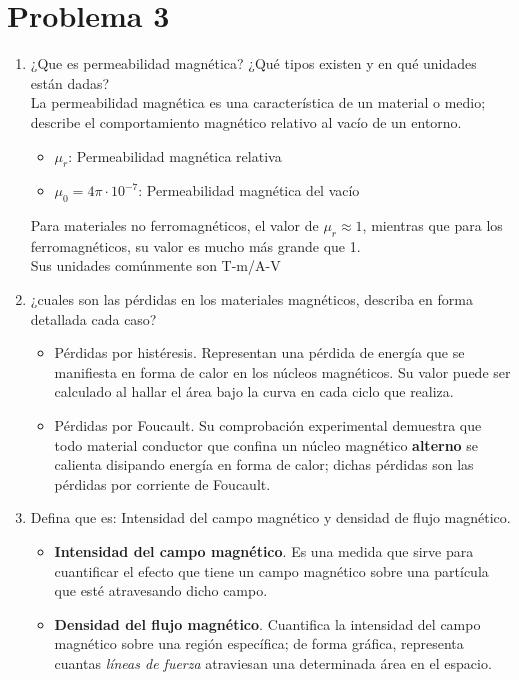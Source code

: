 \documentclass[a4paper,12pt]{article}
\begin{document}
\section*{Problema 3}
\begin{enumerate}
    \item ¿Que es permeabilidad magnética? ¿Qué tipos existen y en qué unidades están
dadas?\\
La permeabilidad magnética es una característica de un material o medio; describe el comportamiento magnético relativo al vacío de un entorno.
\begin{itemize}
    \item $\mu_{r}$: Permeabilidad magnética relativa
    \item $\mu_{0} = 4\pi\cdot 10^{-7}$: Permeabilidad magnética del vacío
\end{itemize}
Para materiales no ferromagnéticos, el valor de $\mu_{r} \approx 1$, mientras que para los ferromagnéticos, su valor es mucho más grande que 1.\\
Sus unidades comúnmente son T-m/A-V
    \item ¿cuales son las pérdidas en los materiales magnéticos, describa en forma detallada
cada caso?
\begin{itemize}
    \item Pérdidas por histéresis. Representan una pérdida de energía que se manifiesta en forma de calor en los núcleos magnéticos. Su valor puede ser calculado al hallar el área bajo la curva en cada ciclo que realiza.
    \item Pérdidas por Foucault. Su comprobación experimental demuestra que todo material conductor que confina un núcleo magnético \textbf{alterno} se calienta disipando energía en forma de calor; dichas pérdidas son las pérdidas por corriente de Foucault.
\end{itemize}
    \item Defina que es: Intensidad del campo magnético y densidad de flujo magnético.\\
    \begin{itemize}
        \item \textbf{Intensidad del campo magnético}. Es una medida que sirve para cuantificar el efecto que tiene un campo magnético sobre una partícula que esté atravesando dicho campo.
        \item \textbf{Densidad del flujo magnético}. Cuantifica la intensidad del campo magnético sobre una región específica; de forma gráfica, representa cuantas \textit{líneas de fuerza} atraviesan una determinada área en el espacio.

\end{itemize}
\end{enumerate}
\end{document}
